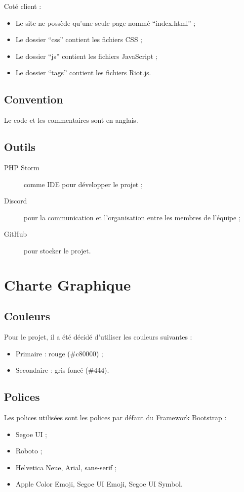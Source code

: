 \documentclass[a4paper, 12pt]{report}
\begin{document}
		Coté client : 
		\begin{itemize}
			\item Le site ne possède qu’une seule page nommé “index.html” ;
			\item Le dossier “css” contient les fichiers CSS ;
			\item Le dossier “js” contient les fichiers JavaScript ;
			\item Le dossier “tags” contient les fichiers Riot.js. 
		\end{itemize}

	\section{Convention} 
		Le code et les commentaires sont en anglais. 

	\section{Outils} 
		\begin{description}
		    \item [PHP Storm] comme IDE pour développer le projet ;
		    \item [Discord] pour la communication et l’organisation entre les membres de l’équipe ;
		    \item [GitHub] pour stocker le projet.
		\end{description}
 
\chapter{Charte Graphique}
	\section{Couleurs}  
		Pour le projet, il a été décidé d’utiliser les couleurs suivantes : 
		\begin{itemize}
			\item Primaire : rouge (\#c80000) ;
			\item Secondaire : gris foncé (\#444).
		\end{itemize}

	\section{Polices} 
		Les polices utilisées sont les polices par défaut du Framework Bootstrap :  
		\begin{itemize}
			\item Segoe UI ;
			\item Roboto ;
			\item Helvetica Neue, Arial, sans-serif ;
			\item Apple Color Emoji, Segoe UI Emoji, Segoe UI Symbol.
		\end{itemize}
\end{document}
